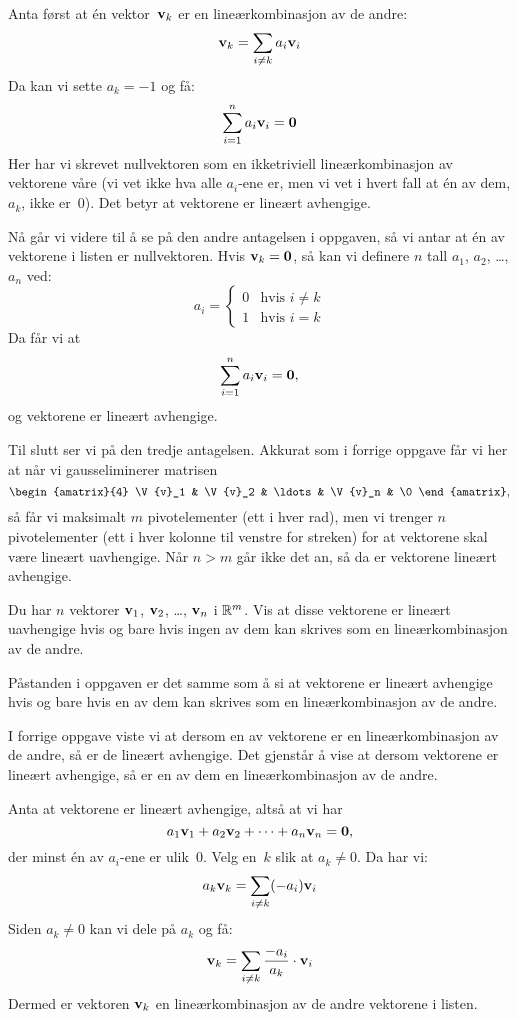 \begin{losning}
Anta først at én vektor~$\mathbf{v}_k$ er en lineærkombinasjon av de andre:
\[
\mathbf{v}_k = \sum_{i \ne k} a_i \mathbf{v}_i
\]
Da kan vi sette $a_k = -1$ og få:
\[
\sum_{i = 1}^n a_i \mathbf{v}_i = \mathbf{0}
\]
Her har vi skrevet nullvektoren som en ikketriviell lineærkombinasjon
av vektorene våre (vi vet ikke hva alle $a_i$-ene er, men vi vet i
hvert fall at én av dem, $a_k$, ikke er~$0$).  Det betyr at vektorene
er lineært avhengige.

Nå går vi videre til å se på den andre antagelsen i oppgaven, så vi
antar at én av vektorene i listen er nullvektoren.  Hvis
$\mathbf{v}_k = \mathbf{0}$, så kan vi definere $n$ tall $a_1$, $a_2$, \ldots,
$a_n$ ved:
\[
a_i =
\begin{cases}
0 & \text{hvis $i \ne k$} \\
1 & \text{hvis $i = k$}
\end{cases}
\]
Da får vi at
\[
\sum_{i = 1}^n a_i \mathbf{v}_i = \mathbf{0},
\]
og vektorene er lineært avhengige.

Til slutt ser vi på den tredje antagelsen.  Akkurat som i forrige
oppgave får vi her at når vi gausseliminerer matrisen
\[
\begin{amatrix}{4} \V{v}_1 & \V{v}_2 & \ldots & \V{v}_n & \0 \end{amatrix},
\]
så får vi maksimalt $m$ pivotelementer (ett i hver rad), men vi
trenger $n$ pivotelementer (ett i hver kolonne til venstre for
streken) for at vektorene skal være lineært uavhengige.  Når $n > m$
går ikke det an, så da er vektorene lineært avhengige.
\end{losning}


\begin{oppgave}
Du har $n$ vektorer $\mathbf{v}_1$, $\mathbf{v}_2$, \ldots, $\mathbf{v}_n$ i $\mathbb{R}^m$.
Vis at disse vektorene er lineært uavhengige hvis og bare hvis ingen
av dem kan skrives som en lineærkombinasjon av de andre.
\end{oppgave}

\begin{losning}
Påstanden i oppgaven er det samme som å si at vektorene er lineært
avhengige hvis og bare hvis en av dem kan skrives som en
lineærkombinasjon av de andre.

I forrige oppgave viste vi at dersom en av vektorene er en
lineærkombinasjon av de andre, så er de lineært avhengige.  Det
gjenstår å vise at dersom vektorene er lineært avhengige, så er en av
dem en lineærkombinasjon av de andre.

Anta at vektorene er lineært avhengige, altså at vi har
\[
a_1 \mathbf{v}_1 + a_2 \mathbf{v}_2 + \cdots + a_n \mathbf{v}_n = \mathbf{0},
\]
der minst én av $a_i$-ene er ulik~$0$.  Velg en~$k$ slik at $a_k \ne 0$.
Da har vi:
\[
a_k \mathbf{v}_k = \sum_{i \ne k} (-a_i) \mathbf{v}_i
\]
Siden $a_k \ne 0$ kan vi dele på $a_k$ og få:
\[
\mathbf{v}_k = \sum_{i \ne k} \frac{-a_i}{a_k} \cdot \mathbf{v}_i
\]
Dermed er vektoren $\mathbf{v}_k$ en lineærkombinasjon av de andre
vektorene i listen.
\end{losning}


